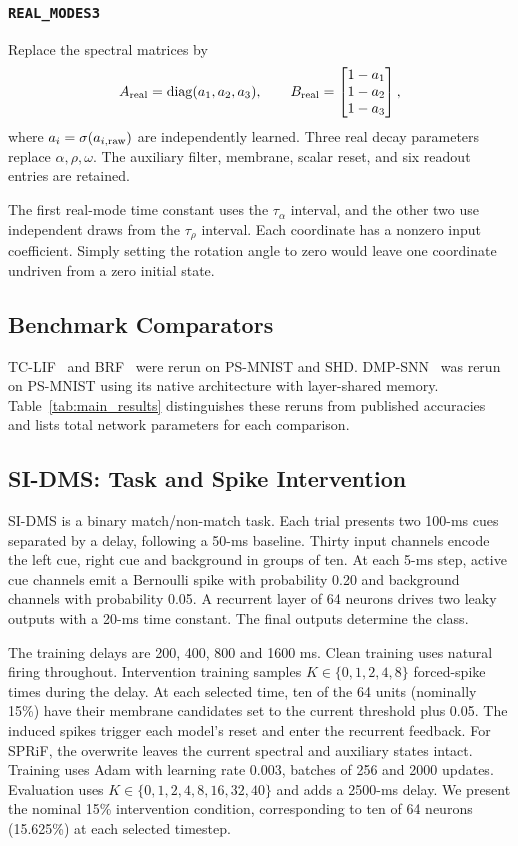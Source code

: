 \documentclass[letterpaper,journal]{IEEEtran}
\newcommand{\rmodes}{\textnormal{\texttt{REAL\_MODES3}}}
\DeclareMathOperator{\diag}{diag}
\begin{document}
\subsubsection{\rmodes}
Replace the spectral matrices by
\begin{equation}
A_{\rm real}=\diag(a_1,a_2,a_3),\qquad
B_{\rm real}=\begin{bmatrix}1-a_1\\1-a_2\\1-a_3\end{bmatrix},
\label{eq:real_control}
\end{equation}
where $a_i=\sigma(a_{i,\rm raw})$ are independently learned. Three real decay parameters replace $\alpha,\rho,\omega$. The auxiliary filter, membrane, scalar reset, and six readout entries are retained.

The first real-mode time constant uses the $\tau_\alpha$ interval, and the other two use independent draws from the $\tau_\rho$ interval. Each coordinate has a nonzero input coefficient. Simply setting the rotation angle to zero would leave one coordinate undriven from a zero initial state.

\subsection{Benchmark Comparators}
\label{sec:baselines}

TC-LIF~\cite{tclif} and BRF~\cite{brf} were rerun on PS-MNIST and SHD. DMP-SNN~\cite{sun2026dmp} was rerun on PS-MNIST using its native architecture with layer-shared memory. Table~\ref{tab:main_results} distinguishes these reruns from published accuracies and lists total network parameters for each comparison.

\subsection{SI-DMS: Task and Spike Intervention}
\label{sec:sidms}

SI-DMS is a binary match/non-match task. Each trial presents two 100-ms cues separated by a delay, following a 50-ms baseline. Thirty input channels encode the left cue, right cue and background in groups of ten. At each 5-ms step, active cue channels emit a Bernoulli spike with probability 0.20 and background channels with probability 0.05. A recurrent layer of 64 neurons drives two leaky outputs with a 20-ms time constant. The final outputs determine the class.

The training delays are 200, 400, 800 and 1600 ms. Clean training uses natural firing throughout. Intervention training samples $K\in\{0,1,2,4,8\}$ forced-spike times during the delay. At each selected time, ten of the 64 units (nominally 15\%) have their membrane candidates set to the current threshold plus 0.05. The induced spikes trigger each model's reset and enter the recurrent feedback. For SPRiF, the overwrite leaves the current spectral and auxiliary states intact. Training uses Adam with learning rate 0.003, batches of 256 and 2000 updates. Evaluation uses $K\in\{0,1,2,4,8,16,32,40\}$ and adds a 2500-ms delay. We present the nominal 15\% intervention condition, corresponding to ten of 64 neurons (15.625\%) at each selected timestep.
\end{document}
